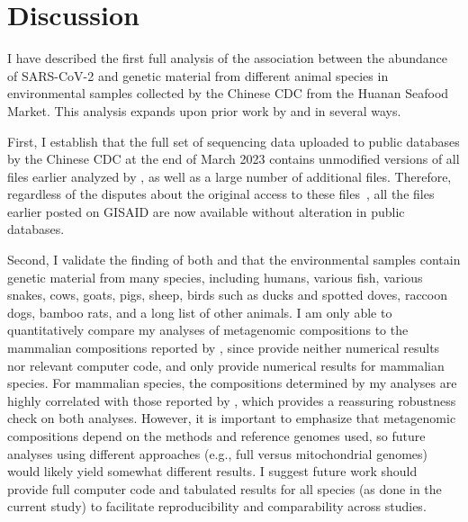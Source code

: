 \documentclass[9pt,twocolumn,twoside]{gsajnl_modified}
\begin{document}
\section{Discussion}
I have described the first full analysis of the association between the abundance of SARS-CoV-2 and genetic material from different animal species in environmental samples collected by the Chinese CDC from the Huanan Seafood Market.
This analysis expands upon prior work by \citet{liu2023surveillance} and \citet{crits2023genetic} in several ways.

First, I establish that the full set of sequencing data uploaded to public databases by the Chinese CDC at the end of March 2023 contains unmodified versions of all files earlier analyzed by \citet{crits2023genetic}, as well as a large number of additional files.
Therefore, regardless of the disputes about the original access to these files~\citep{cohen2023new,gisaid_statement,crits2023genetic}, all the files earlier posted on GISAID are now available without alteration in public databases.

Second, I validate the finding of both \citet{crits2023genetic} and \citet{liu2023surveillance} that the environmental samples contain genetic material from many species, including humans, various fish, various snakes, cows, goats, pigs, sheep, birds such as ducks and spotted doves, raccoon dogs, bamboo rats, and a long list of other animals.
I am only able to quantitatively compare my analyses of metagenomic compositions to the mammalian compositions reported by \citet{crits2023genetic}, since \citet{liu2023surveillance} provide neither numerical results nor relevant computer code, and \citet{crits2023genetic} only provide numerical results for mammalian species.
For mammalian species, the compositions determined by my analyses are highly correlated with those reported by \citet{crits2023genetic}, which provides a reassuring robustness check on both analyses.
However, it is important to emphasize that metagenomic compositions depend on the methods and reference genomes used, so future analyses using different approaches (e.g., full versus mitochondrial genomes) would likely yield somewhat different results.
I suggest future work should provide full computer code and tabulated results for all species (as done in the current study) to facilitate reproducibility and comparability across studies.
\end{document}
